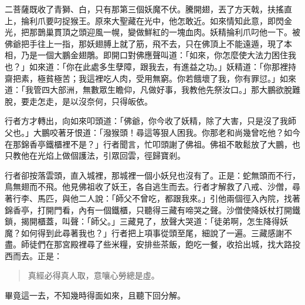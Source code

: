 二菩薩既收了青獅、白，只有那第三個妖魔不伏。騰開翅，丟了方天戟，扶搖直上，掄利爪要叼捉猴王。原來大聖藏在光中，他怎敢近。如來情知此意，即閃金光，把那鵲巢貫頂之頭迎風一幌，變做鮮紅的一塊血肉。妖精掄利爪叼他一下。被佛爺把手往上一指，那妖翅膊上就了筋，飛不去，只在佛頂上不能遠遁，現了本相，乃是一個大鵬金翅鵰。即開口對佛應聲叫道：「如來，你怎麼使大法力困住我也？」如來道：「你在此處多生孽障，跟我去，有進益之功。」妖精道：「你那裡持齋把素，極貧極苦；我這裡吃人肉，受用無窮。你若餓壞了我，你有罪愆。」如來道：「我管四大部洲，無數眾生瞻仰，凡做好事，我教他先祭汝口。」那大鵬欲脫難脫，要走怎走，是以沒奈何，只得皈依。

行者方才轉出，向如來叩頭道：「佛爺，你今收了妖精，除了大害，只是沒了我師父也。」大鵬咬著牙恨道：「潑猴頭！尋這等狠人困我。你那老和尚幾曾吃他？如今在那錦香亭鐵櫃裡不是？」行者聞言，忙叩頭謝了佛祖。佛祖不敢鬆放了大鵬，也只教他在光焰上做個護法，引眾回雲，徑歸寶剎。

行者卻按落雲頭，直入城裡，那城裡一個小妖兒也沒有了。正是：蛇無頭而不行，鳥無翅而不飛。他見佛祖收了妖王，各自逃生而去。行者才解救了八戒、沙僧，尋著行李、馬匹，與他二人說：「師父不曾吃，都跟我來。」引他兩個徑入內院，找著錦香亭，打開門看，內有一個鐵櫃，只聽得三藏有啼哭之聲。沙僧使降妖杖打開鐵鎖，揭開櫃蓋，叫聲：「師父。」三藏見了，放聲大哭道：「徒弟啊，怎生降得妖魔？如何得到此尋著我也？」行者把上項事從頭至尾，細說了一遍。三藏感謝不盡。師徒們在那宮殿裡尋了些米糧，安排些茶飯，飽吃一餐，收拾出城，找大路投西而去。正是：
\begin{quote}
真經必得真人取，意嚷心勞總是虛。
\end{quote}

畢竟這一去，不知幾時得面如來，且聽下回分解。

